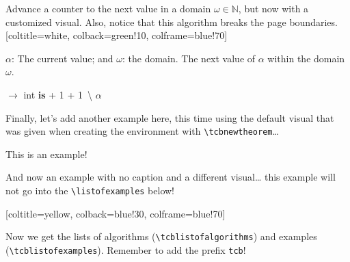 \documentclass{article}
\begin{document}
\begin{tcbalgorithm}{Advance a counter to the next value in a domain $\omega \in \mathbb{N}$, but now with a customized visual. Also, notice that this algorithm breaks the page boundaries.}[coltitle=white, colback=green!10, colframe=blue!70]
  \label{alg:advance2}
\begin{algorithmic}[1]
  \Statex \Input $\alpha$: The current value; and $\omega$: the domain.
  \Statex \Output The next value of $\alpha$ within the domain $\omega$.

  \Vspace

   $\rightarrow$ int \textbf{is}
    \Let {\alpha} {\alpha + 1}
    \While{$\alpha \not\in \omega \And \omega \neq \bracesemptyset$}
      \Let {\alpha} {\alpha + 1}
    \EndWhile
    \If{$\omega \neq \bracesemptyset$}
      \Let {\omega} {\omega \,\backslash \lbrace \alpha \rbrace}
    \EndIf
    \State \Return $\alpha$
  \EndFunction
\end{algorithmic}
\end{tcbalgorithm}

\emph{\kant[2]}

Finally, let's add another example here, this time using the default visual that was given when creating the environment with \verb!\tcbnewtheorem!…

\begin{tcbexample}{This is an example!}
  \emph{\kant[3]}
\end{tcbexample}

And now an example with no caption and a different visual…  this example will not go into the \verb!\listofexamples! below!

\begin{tcbexample}{}[coltitle=yellow, colback=blue!30, colframe=blue!70]
  \emph{\kant[4]}
\end{tcbexample}

Now we get the lists of algorithms (\verb!\tcblistofalgorithms!) and examples (\verb!\tcblistofexamples!). Remember to add the prefix \verb!tcb!!

\tcblistofalgorithms

\tcblistofexamples
\end{document}
